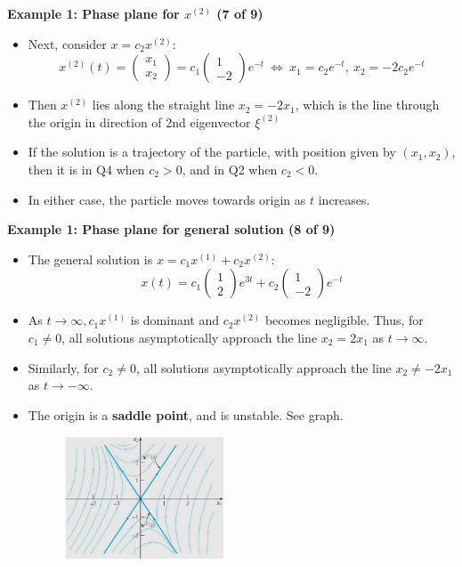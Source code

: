 \documentclass[11pt,a4paper]{article}
\begin{document}
	\textbf{Example 1: Phase plane for $x^{(2)}$ (7 of 9)}
	\begin{itemize}
		\item Next, consider $x = c_2x^{(2)}$:
		$$
		x^{(2)}(t) =
		\begin{pmatrix}
			x_1\\
			x_2
		\end{pmatrix} = c_1
		\begin{pmatrix}
			1\\
			-2
		\end{pmatrix}e^{-t}\ \Leftrightarrow\ x_1 = c_2e^{-t},\ x_2 = -2c_2e^{-t}
		$$
		\item Then $x^{(2)}$ lies along the straight line $x_2 = -2x_1$, which is the line through the origin in direction of 2nd eigenvector $\xi^{(2)}$
		\item If the solution is a trajectory of the particle, with position given by $(x_1, x_2)$, then it is in Q4 when $c_2 > 0$, and in Q2 when $c_2 < 0$.
		\item In either case, the particle moves towards origin as $t$ increases. 
	\end{itemize}
	\textbf{Example 1: Phase plane for general solution (8 of 9)}
	\begin{itemize}
		\item The general solution is $x = c_1x^{(1)} + c_2x^{(2)}$:
		$$
		x(t) = c_1
		\begin{pmatrix}
			1\\
			2
		\end{pmatrix}e^{3t} + c_2
		\begin{pmatrix}
			1\\
			-2
		\end{pmatrix}e^{-t}
		$$
		\item As $t \to \infty, c_1x^{(1)}$ is dominant and $c_2x^{(2)}$ becomes negligible. Thus, for $c_1 \neq 0$, all solutions asymptotically approach the line $x_2 = 2x_1$ as $t \to \infty$.
		\item Similarly, for $c_2 \neq 0$, all solutions asymptotically approach the line $x_2 \neq -2x_1$ as $t \to -\infty$.
		\item The origin is a \textbf{saddle point}, and is unstable. See graph.
		\begin{figure}[H]
			\centering
				\includegraphics[width=0.45\textwidth]{figure/Lec12f2.PNG}
		\end{figure}
	\end{itemize}
\end{document}
